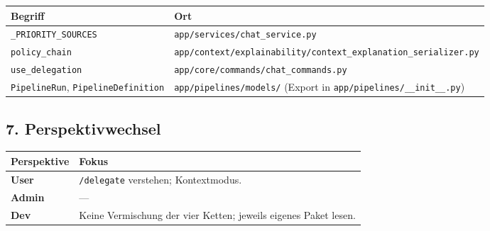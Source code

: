 \begin{center}
\begin{tabular}{ll}
\hline
Begriff & Ort \\
\hline
\texttt{\_PRIORITY\_SOURCES} & \texttt{app/services/chat\_service.py} \\
\texttt{policy\_chain} & \texttt{app/context/explainability/context\_explanation\_serializer.py} \\
\texttt{use\_delegation} & \texttt{app/core/commands/chat\_commands.py} \\
\texttt{PipelineRun}, \texttt{PipelineDefinition} & \texttt{app/pipelines/models/} (Export in \texttt{app/pipelines/\_\_init\_\_.py}) \\
\hline
\end{tabular}
\end{center}

\subsection{7. Perspektivwechsel}

\begin{center}
\begin{tabular}{ll}
\hline
Perspektive & Fokus \\
\hline
\textbf{User} & \texttt{/delegate} verstehen; Kontextmodus. \\
\textbf{Admin} & --- \\
\textbf{Dev} & Keine Vermischung der vier Ketten; jeweils eigenes Paket lesen. \\
\hline
\end{tabular}
\end{center}
